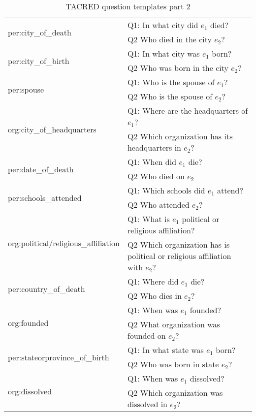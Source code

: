 \documentclass[11pt]{article}
\begin{document}
\begin{table*}[]
{\begin{tabular}{|l|l|}
\multirow{2}{*}{ per:city\_of\_death } & Q1:  In what city did $e_1$ died?                 \\
               & Q2 Who died in the city $e_2$?                 \\ \hline
\multirow{2}{*}{ per:city\_of\_birth } & Q1:  In what city was $e_1$ born?                 \\
               & Q2 Who was born in the city $e_2$?                 \\ \hline
\multirow{2}{*}{ per:spouse } & Q1:  Who is the spouse of $e_1$?                 \\
               & Q2 Who is the spouse of $e_2$?                 \\ \hline
\multirow{2}{*}{ org:city\_of\_headquarters } & Q1:  Where are the headquarters of $e_1$?                 \\
               & Q2 Which organization has its headquarters in $e_2$?                 \\ \hline
\multirow{2}{*}{ per:date\_of\_death } & Q1:  When did $e_1$ die?                 \\
               & Q2 Who died on $e_2$                 \\ \hline
\multirow{2}{*}{ per:schools\_attended } & Q1:  Which schools did $e_1$ attend?                 \\
               & Q2 Who attended $e_2$?                 \\ \hline
\multirow{2}{*}{ org:political/religious\_affiliation } & Q1:  What is $e_1$ political or religious affiliation?                 \\
               & Q2 Which organization has is political or religious affiliation with $e_2$?                 \\ \hline
\multirow{2}{*}{ per:country\_of\_death } & Q1:  Where did $e_1$ die?                 \\
               & Q2 Who dies in $e_2$?                 \\ \hline
\multirow{2}{*}{ org:founded } & Q1:  When was $e_1$ founded?                 \\
               & Q2 What organization was founded on $e_2$?                 \\ \hline
\multirow{2}{*}{ per:stateorprovince\_of\_birth } & Q1:  In what state was $e_1$ born?                 \\
               & Q2 Who was born in state $e_2$?                 \\ \hline
\multirow{2}{*}{ org:dissolved } & Q1:  When was $e_1$ dissolved?                 \\
               & Q2 Which organization was dissolved in $e_2$?                 \\ \hline
\end{tabular}}
\caption{TACRED question templates part 2}
\label{tbl:tmp2}
\end{table*}
\end{document}
